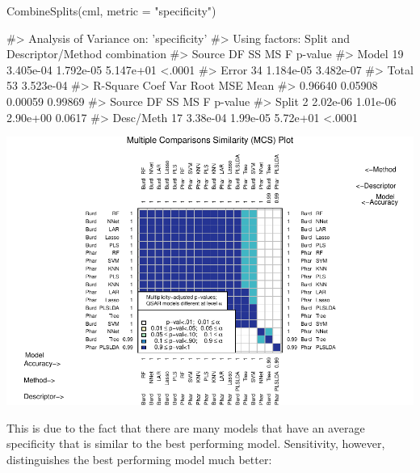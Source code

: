 \begin{Schunk}
\begin{Sinput}
CombineSplits(cml, metric = "specificity")
\end{Sinput}
\begin{Soutput}
#>    Analysis of Variance on: 'specificity'
#>  Using factors: Split and Descriptor/Method combination
#> Source    DF          SS          MS           F   p-value   
#> Model     19   3.405e-04   1.792e-05   5.147e+01    <.0001   
#> Error     34   1.184e-05   3.482e-07   
#> Total     53   3.523e-04   
#>       R-Square   Coef Var   Root MSE       Mean   
#>        0.96640    0.05908    0.00059    0.99869   
#> Source       DF         SS         MS          F   p-value   
#> Split         2   2.02e-06   1.01e-06   2.90e+00    0.0617   
#> Desc/Meth    17   3.38e-04   1.99e-05   5.72e+01    <.0001
\end{Soutput}

\includegraphics{chemmodlabRJournal_files/figure-latex/CombineSplits_sp-1} \end{Schunk}

This is due to the fact that there are many models that have an average
specificity that is similar to the best performing model. Sensitivity,
however, distinguishes the best performing model much better:

